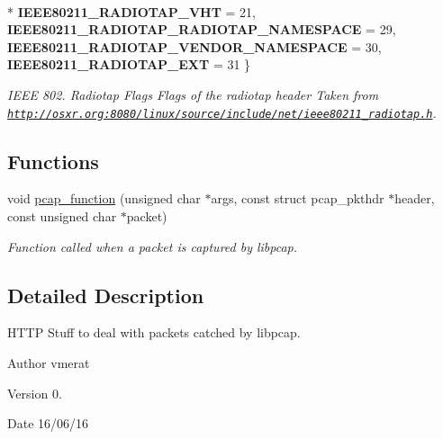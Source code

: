 \begin{DoxyCompactItemize}
\\*
{\bfseries I\-E\-E\-E80211\-\_\-\-R\-A\-D\-I\-O\-T\-A\-P\-\_\-\-V\-H\-T} = 21, 
{\bfseries I\-E\-E\-E80211\-\_\-\-R\-A\-D\-I\-O\-T\-A\-P\-\_\-\-R\-A\-D\-I\-O\-T\-A\-P\-\_\-\-N\-A\-M\-E\-S\-P\-A\-C\-E} = 29, 
{\bfseries I\-E\-E\-E80211\-\_\-\-R\-A\-D\-I\-O\-T\-A\-P\-\_\-\-V\-E\-N\-D\-O\-R\-\_\-\-N\-A\-M\-E\-S\-P\-A\-C\-E} = 30, 
{\bfseries I\-E\-E\-E80211\-\_\-\-R\-A\-D\-I\-O\-T\-A\-P\-\_\-\-E\-X\-T} = 31
 \}
\begin{DoxyCompactList}\small\item\em I\-E\-E\-E 802. Radiotap Flags Flags of the radiotap header Taken from \href{http://osxr.org:8080/linux/source/include/net/ieee80211_radiotap.h}{\tt http\-://osxr.\-org\-:8080/linux/source/include/net/ieee80211\-\_\-radiotap.\-h}. \end{DoxyCompactList}\end{DoxyCompactItemize}
\subsection*{Functions}
\begin{DoxyCompactItemize}
\item 
void \hyperlink{pcap-thread_8h_aa3e276e495ceedb3b1b14b175798790f}{pcap\-\_\-function} (unsigned char $\ast$args, const struct pcap\-\_\-pkthdr $\ast$header, const unsigned char $\ast$packet)
\begin{DoxyCompactList}\small\item\em Function called when a packet is captured by libpcap. \end{DoxyCompactList}\end{DoxyCompactItemize}


\subsection{Detailed Description}
H\-T\-T\-P Stuff to deal with packets catched by libpcap. \begin{DoxyAuthor}{Author}
vmerat 
\end{DoxyAuthor}
\begin{DoxyVersion}{Version}
0. 
\end{DoxyVersion}
\begin{DoxyDate}{Date}
16/06/16 
\end{DoxyDate}


